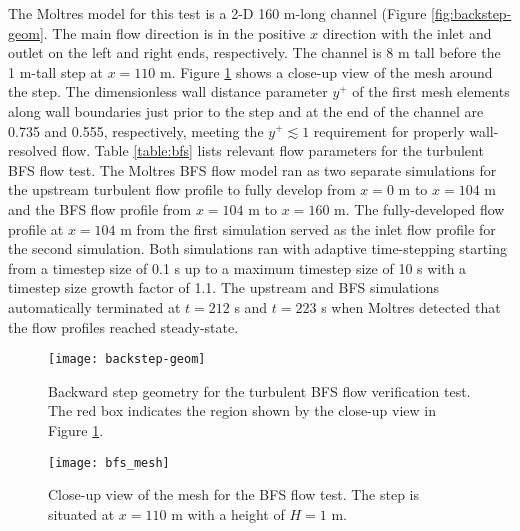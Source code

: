 The Moltres model for this test is a 2-D 160 m-long channel (Figure \ref{fig:backstep-geom}.
The main flow direction is in the
positive $x$ direction with the inlet and outlet on the left and right ends, respectively. The
channel is 8 m tall before the 1 m-tall step at $x=110$ m. Figure \ref{fig:bfs-mesh} shows a
close-up view of the mesh around the step. The dimensionless wall distance parameter $y^+$ of the
first mesh elements along wall boundaries just prior to the step and at the end of the channel are
0.735 and 0.555, respectively, meeting the $y^+ \lesssim 1$ requirement for properly wall-resolved
flow. Table \ref{table:bfs} lists relevant flow parameters for the turbulent \gls{BFS} flow test.
The Moltres \gls{BFS} flow model ran as two separate simulations for the upstream turbulent flow
profile to fully develop from $x=0$ m to $x=104$ m and the \gls{BFS} flow profile from $x=104$ m to
$x=160$ m. The fully-developed flow profile at $x=104$ m from the first simulation served as the
inlet flow profile for the second simulation. Both simulations ran with adaptive time-stepping
starting from a timestep size of 0.1 s up to a maximum timestep size of 10 s with a timestep size
growth factor of 1.1. The upstream and \gls{BFS} simulations automatically terminated at $t=212$ s
and $t=223$ s when Moltres detected that the flow profiles reached steady-state.

\begin{figure}[p]
  \centering
  \texttt{[image: backstep-geom]}
  \caption{Backward step geometry for the turbulent \gls{BFS} flow verification test. The red box indicates
  the region shown by the close-up view in Figure \ref{fig:bfs-mesh}.}
  \label{fig:backstep-geom}
  \centering
  \texttt{[image: bfs\_mesh]}
  \caption{Close-up view of the mesh for the \gls{BFS} flow test. The step is situated at $x=110$ m
  with a height of $H=1$ m.}
  \label{fig:bfs-mesh}
\end{figure}

